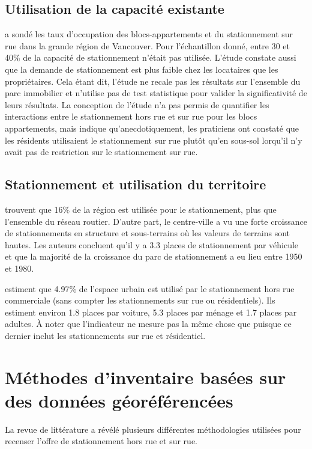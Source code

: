   \subsection{Utilisation de la capacité existante}
\textcite{Translink:2018Regional:2019} a sondé les taux d'occupation des blocs-appartements et du stationnement sur rue dans la grande région de Vancouver. Pour l'échantillon donné, entre 30 et 40\% de la capacité de stationnement n'était pas utilisée. L'étude constate aussi que la demande de stationnement est plus faible chez les locataires que les propriétaires. Cela étant dit, l'étude ne recale pas les résultats sur l'ensemble du parc immobilier et n'utilise pas de test statistique pour valider la significativité de leurs résultats. La conception de l'étude n'a pas permis de quantifier les interactions entre le stationnement hors rue et sur rue pour les blocs appartements, mais indique qu'anecdotiquement, les praticiens ont constaté que les résidents utilisaient le stationnement sur rue plutôt qu'en sous-sol lorqu'il n'y avait pas de restriction sur le stationnement sur rue. 

\subsection{Stationnement et utilisation du territoire}
\textcite{Chester:ParkingInfrastructure:2015} trouvent que 16\% de la région est utilisée pour le stationnement, plus que l'ensemble du réseau routier. D'autre part, le centre-ville a vu une forte croissance de stationnements en structure et sous-terrains où les valeurs de terrains sont hautes. Les auteurs concluent qu'il y a 3.3 places de stationnement par véhicule et que la majorité de la croissance du parc de stationnement a eu lieu entre 1950 et 1980.\par

\textcite{Davis:EstimatingParking:2010} estiment que 4.97\% de l'espace urbain est utilisé par le stationnement hors rue commerciale (sans compter les stationnements sur rue ou résidentiels). Ils estiment environ 1.8 places par voiture, 5.3 places par ménage et 1.7 places par adultes. À noter que l'indicateur ne mesure pas la même chose que \textcite{Chester:ParkingInfrastructure:2015} puisque ce dernier inclut les stationnements sur rue et résidentiel.
\section{Méthodes d'inventaire basées sur des données géoréférencées}
  La revue de littérature a révélé plusieurs différentes méthodologies utilisées pour recenser l'offre de stationnement hors rue et sur rue. 

